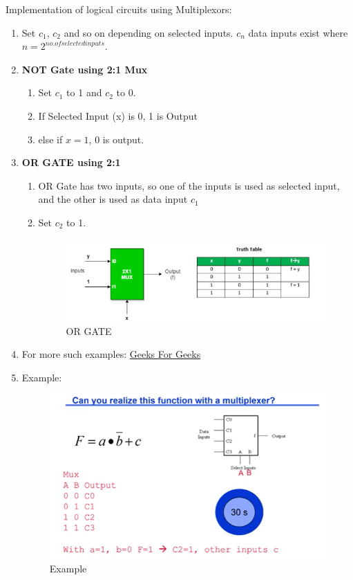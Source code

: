 \documentclass[11pt, a4paper]{article}
\begin{document}
Implementation of logical circuits using Multiplexors:
\begin{enumerate}
    \item Set $c_1$, $c_2$ and so on depending on selected inputs. $c_n$ data inputs exist where $n=2^{no. of selected inputs}$.
    \item \textbf{NOT Gate using 2:1 Mux}
    \begin{enumerate}
        \item Set $c_1$ to 1 and $c_2$ to 0.
        \item If Selected Input (x) is 0, 1 is Output
        \item else if $x=1$, $0$ is output.
    \end{enumerate}
    \item \textbf{OR GATE using 2:1}
    \begin{enumerate}
        \item OR Gate has two inputs, so one of the inputs is used as selected input, and the other is used as data input $c_1$
        \item Set $c_2$ to 1.
        \begin{figure}[H]
            \centering
            \includegraphics[width = \textwidth]{Pictures/MakingLogicUsingMux.png}
            \caption{OR GATE}
        \end{figure}
    \end{enumerate}
    \item For more such examples: \href{https://www.geeksforgeeks.org/multiplexers-in-digital-logic/}{Geeks For Geeks}
    \item Example:
    \begin{figure}[H]
        \centering
       \includegraphics{Pictures/MakingLogicExc.png}
        \caption{Example}
    \end{figure}
\end{enumerate}
\end{document}
